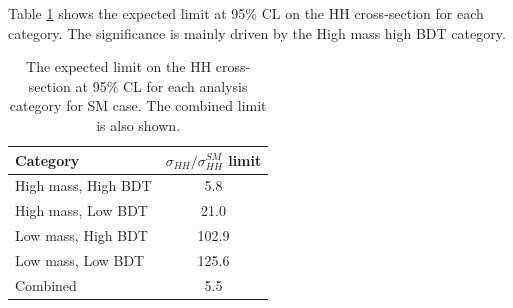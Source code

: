 Table \ref{tab:HHyybb:Results:Xsec:Cat} shows the expected limit at 95\% CL on the HH cross-section for each category. The significance is mainly driven by the High mass high BDT category. 

\begin{table}[htbp]
    \centering
    \begin{tabular}{lc}
        \hline\hline
        Category &  $\sigma_{HH}/\sigma_{HH}^{SM}$ limit \\
        \hline
        High mass, High BDT &  5.8 \\
        High mass, Low BDT &  21.0  \\
        Low mass, High BDT &  102.9 \\
        Low mass, Low BDT  &  125.6 \\
        \hline 
        Combined & 5.5 \\
        \hline\hline
    \end{tabular}
    \begin{tcolorbox}[colback=black!5!white,colframe=white!75!black]
    \caption{The expected limit on the HH cross-section at 95\% CL for each analysis category for SM case. The combined limit is also shown.}
    \label{tab:HHyybb:Results:Xsec:Cat}
    \end{tcolorbox}
\end{table}


